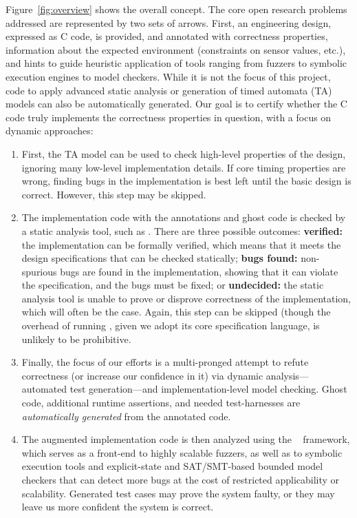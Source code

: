 Figure~\ref{fig:overview} shows the overall concept.  The core
open research problems addressed are represented by two sets of
arrows.  First, an engineering design, expressed as C code, is
provided, and annotated with correctness properties, information
about the expected environment (constraints on sensor values, etc.),
and hints to guide heuristic application of tools ranging from fuzzers
to symbolic execution engines to model checkers.
While it is not the focus of this project, code to apply advanced static analysis or generation of timed
automata (TA) models can also be automatically generated.  
Our goal is to certify whether the C code truly implements the
correctness properties in question, with a focus on dynamic approaches:
\begin{enumerate}[labelsep=3pt,leftmargin=12pt]
\item First, the TA model can be used to check high-level properties
  of the design, ignoring many low-level implementation details.  If
  core timing properties are wrong, finding bugs in the implementation
  is best left until the basic design is correct.  However, this step
  may be skipped.
\item The implementation code with the \acsl annotations and ghost code
  is checked by a static analysis tool, such as \framac.
  There are three possible outcomes:
  {\bf verified:} the implementation can be formally verified, which
  means that it meets the design specifications that can be checked statically;
  {\bf bugs found:} non-spurious bugs are found in the implementation, showing that
    it can violate the specification, and the bugs must be fixed; or
  {\bf undecided:} the static analysis tool is unable to prove or
  disprove correctness of the implementation, which will often be the
  case.  Again, this step can be skipped (though the overhead of
  running \framac, given we adopt its core specification language, is
  unlikely to be prohibitive.
\item Finally, the focus of our efforts is a multi-pronged attempt to refute correctness (or increase our confidence
  in it) via dynamic analysis---automated test generation---and
  implementation-level model checking.
  Ghost code, additional runtime assertions, and needed test-harnesses are \emph{automatically generated} from the
  annotated code.
\item The augmented implementation code is then analyzed using the
  \deepstate~\cite{DeepState} framework, which serves as a front-end
  to highly scalable fuzzers, as well as to symbolic execution tools
  and explicit-state and SAT/SMT-based bounded model checkers that can
  detect more bugs at the cost of restricted applicability or scalability.  Generated test cases may
  prove the system faulty, or they may leave us more confident
  the system is correct.
\end{enumerate}

